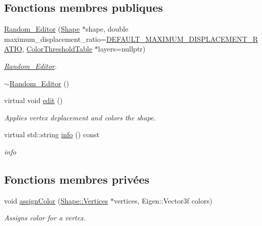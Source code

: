\subsection*{Fonctions membres publiques}
\begin{DoxyCompactItemize}
\item 
\hyperlink{class_random___editor_a68118d2b9929e7c9dbb821ce76554164}{Random\+\_\+\+Editor} (\hyperlink{class_shape}{Shape} $\ast$shape, double maximum\+\_\+displacement\+\_\+ratio=\hyperlink{editor_8h_ad4ef0738a1a62405f443237adf55b8c8}{D\+E\+F\+A\+U\+L\+T\+\_\+\+M\+A\+X\+I\+M\+U\+M\+\_\+\+D\+I\+S\+P\+L\+A\+C\+E\+M\+E\+N\+T\+\_\+\+R\+A\+T\+IO}, \hyperlink{thresholdtable_8h_ab0deb49d07758f9814993774cb9935cc}{Color\+Threshold\+Table} $\ast$layers=nullptr)
\begin{DoxyCompactList}\small\item\em \hyperlink{class_random___editor}{Random\+\_\+\+Editor}. \end{DoxyCompactList}\item 
\hyperlink{class_random___editor_a8a062c4450faafac081ff65b7465545d}{$\sim$\+Random\+\_\+\+Editor} ()
\item 
virtual void \hyperlink{class_random___editor_abea41199b1502f89be0b2914b3c191fc}{edit} ()
\begin{DoxyCompactList}\small\item\em Applies vertex deplacement and colors the shape. \end{DoxyCompactList}\item 
virtual std\+::string \hyperlink{class_random___editor_aa194991b2926aeab96ad5470f549f087}{info} () const
\begin{DoxyCompactList}\small\item\em info \end{DoxyCompactList}\end{DoxyCompactItemize}
\subsection*{Fonctions membres privées}
\begin{DoxyCompactItemize}
\item 
void \hyperlink{class_random___editor_a24b101aa09fc78ad3febf247ae47038d}{assign\+Color} (\hyperlink{struct_shape_1_1_vertices}{Shape\+::\+Vertices} $\ast$vertices, Eigen\+::\+Vector3f colors)
\begin{DoxyCompactList}\small\item\em Assigns color for a vertex. \end{DoxyCompactList}\end{DoxyCompactItemize}
